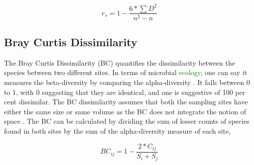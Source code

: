 $$r_{s} = 1 - \frac{6 * \sum D^{2}}{n^{3} - n}$$

\subsection{Bray Curtis Dissimilarity}
The Bray Curtis Dissimilarity (BC) quantifies the dissimilarity between the species between two different sites. In terms of microbial \textcolor{green}{ecology}, one can say it measures the beta-diversity by comparing the alpha-diversity \cite{zhang_2019_the}. It falls between 0 to 1, with 0 suggesting that they are identical, and one is suggestive of 100 per cent dissimilar. The BC dissimilarity assumes that both the sampling sites have either the same size or same volume as the BC does not integrate the notion of space \cite{zhang_2019_the}. The BC can be calculated by dividing the sum of lesser counts of species found in both sites by the sum of the alpha-diversity measure of each site,

$$BC_{ij} = 1 - \frac{2 * C_{ij}}{S_{i} + S_{j}}$$
